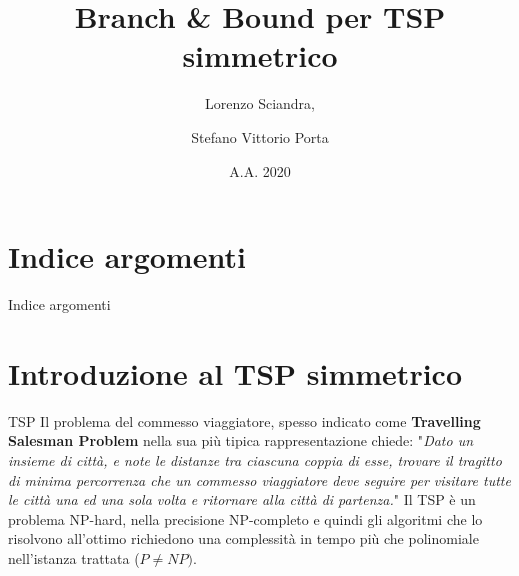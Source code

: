 \documentclass[10pt]{beamer}
\title{Branch \& Bound per TSP simmetrico}
\author{Lorenzo Sciandra, \and Stefano Vittorio Porta}
\date{A.A. 2020\-2021}
\institute{Università degli Studi di Torino}
\begin{document}
    \maketitle


    \section{Indice argomenti}\label{sec:indice-argomenti}

    \begin{frame}{Indice argomenti}
        \tableofcontents
    \end{frame}


    \section{Introduzione al TSP simmetrico}\label{sec:introduzione-al-tsp-simmetrico}
    \begin{frame}{TSP}
        Il problema del commesso viaggiatore, spesso indicato come \textbf{Travelling Salesman Problem} nella sua più tipica rappresentazione chiede:\newline
        "\textit{Dato un insieme di città, e note le distanze tra ciascuna coppia di esse, trovare il tragitto di minima percorrenza che un commesso viaggiatore deve seguire per visitare tutte le città una ed una sola volta e ritornare alla città di partenza.}"
        \newline
        \newline
        Il TSP è un problema NP-hard, nella precisione NP-completo e quindi gli algoritmi che lo risolvono all'ottimo richiedono una complessità in tempo più che polinomiale nell'istanza trattata ($P \neq NP)$.
    \end{frame}
\end{document}
